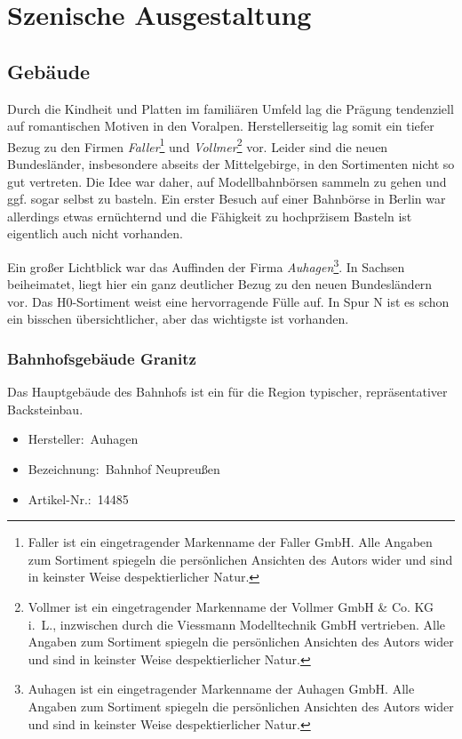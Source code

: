 \section{Szenische Ausgestaltung}
\label{sec:diorama}



\subsection{Geb\"aude}

Durch die Kindheit und Platten im famili\"aren Umfeld lag die Pr\"agung tendenziell auf romantischen Motiven in den Voralpen.
Herstellerseitig lag somit ein tiefer Bezug zu den Firmen
\textit{Faller}\footnote{Faller ist ein eingetragender Markenname der Faller GmbH. Alle Angaben zum Sortiment spiegeln die pers\"onlichen Ansichten des Autors wider und sind in keinster Weise despektierlicher Natur.} und
\textit{Vollmer}\footnote{Vollmer ist ein eingetragender Markenname der Vollmer GmbH \& Co. KG i.~L., inzwischen durch die Viessmann Modelltechnik GmbH vertrieben. Alle Angaben zum Sortiment spiegeln die pers\"onlichen Ansichten des Autors wider und sind in keinster Weise despektierlicher Natur.} vor.
Leider sind die neuen Bundesl\"ander, insbesondere abseits der Mittelgebirge, in den Sortimenten nicht so gut vertreten.
Die Idee war daher, auf Modellbahnb\"orsen sammeln zu gehen und ggf. sogar selbst zu basteln.
Ein erster Besuch auf einer Bahnb\"orse in Berlin war allerdings etwas ern\"uchternd und die F\"ahigkeit zu hochpr\"zisem Basteln ist eigentlich auch nicht vorhanden.

Ein gro{\ss}er Lichtblick war das Auffinden der Firma
\textit{Auhagen}\footnote{Auhagen ist ein eingetragender Markenname der Auhagen GmbH. Alle Angaben zum Sortiment spiegeln die pers\"onlichen Ansichten des Autors wider und sind in keinster Weise despektierlicher Natur.}.
In Sachsen beiheimatet, liegt hier ein ganz deutlicher Bezug zu den neuen Bundesl\"andern vor.
Das H0-Sortiment weist eine hervorragende F\"ulle auf.
In Spur N ist es schon ein bisschen \"ubersichtlicher, aber das wichtigste ist vorhanden.



\subsubsection{Bahnhofsgeb\"aude Granitz}

Das Hauptgeb\"aude des Bahnhofs ist ein f\"ur die Region typischer, repr\"asentativer Backsteinbau.
\begin{itemize}
	\item[] Hersteller:~Auhagen
	\item[] Bezeichnung:~Bahnhof Neupreu{\ss}en
	\item[] Artikel-Nr.:~14485
\end{itemize}


